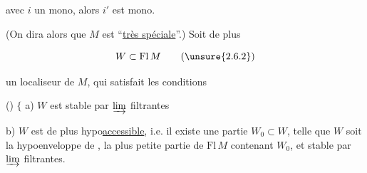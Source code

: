 avec $i$ un mono, alors $i'$ est mono.


(On dira alors que $M$ est ``\uline{très spéciale}''.) Soit
de plus

\[
 W\subset\mathrm{Fl}\,M\tag*{(\unsure{2.6.2})}
\]

un localiseur de $M$, qui satisfait les conditions

() \(\Bigg\{\)
a) $W$ est stable par $\varinjlim$ filtrantes


b) $W$ est de plus hypo\uline{accessible}, i.e. il
existe une \uline{} partie $W_0\subset W$,
telle que $W$ soit la hypoenveloppe de
,   la plus petite partie de
$\mathrm{Fl}\,M$  contenant $W_0$, et stable
par $\varinjlim$ filtrantes.
